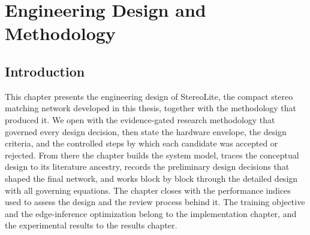 \chapter{Engineering Design and Methodology}
\label{ch:design}

\section{Introduction}
This chapter presents the engineering design of StereoLite, the compact
stereo matching network developed in this thesis, together with the
methodology that produced it. We open with the evidence-gated research
methodology that governed every design decision, then state the hardware
envelope, the design criteria, and the controlled steps by which each
candidate was accepted or rejected. From there the chapter builds the
system model, traces the conceptual design to its literature ancestry,
records the preliminary design decisions that shaped the final network,
and works block by block through the detailed design with all governing
equations. The chapter closes with the performance indices used to
assess the design and the review process behind it. The training
objective and the edge-inference optimization belong to the
implementation chapter, and the experimental results to the results
chapter.

\FloatBarrier
